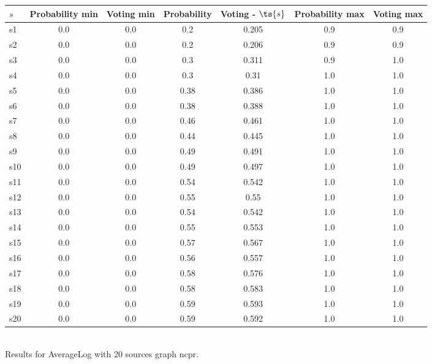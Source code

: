 \documentclass{article}
\begin{document}
\noindent\begin{tabular}{|l|c|c|c|c|c|c|}
\hline
$s$& Probability min & Voting min & Probability & Voting - $\ts{s}$ & Probability max & Voting max\\
\hline
s1 &0.0 & 0.0 & 0.2 & 0.205 & 0.9 & 0.9\\
\hline
s2 &0.0 & 0.0 & 0.2 & 0.206 & 0.9 & 0.9\\
\hline
s3 &0.0 & 0.0 & 0.3 & 0.311 & 0.9 & 1.0\\
\hline
s4 &0.0 & 0.0 & 0.3 & 0.31 & 1.0 & 1.0\\
\hline
s5 &0.0 & 0.0 & 0.38 & 0.386 & 1.0 & 1.0\\
\hline
s6 &0.0 & 0.0 & 0.38 & 0.388 & 1.0 & 1.0\\
\hline
s7 &0.0 & 0.0 & 0.46 & 0.461 & 1.0 & 1.0\\
\hline
s8 &0.0 & 0.0 & 0.44 & 0.445 & 1.0 & 1.0\\
\hline
s9 &0.0 & 0.0 & 0.49 & 0.491 & 1.0 & 1.0\\
\hline
s10 &0.0 & 0.0 & 0.49 & 0.497 & 1.0 & 1.0\\
\hline
s11 &0.0 & 0.0 & 0.54 & 0.542 & 1.0 & 1.0\\
\hline
s12 &0.0 & 0.0 & 0.55 & 0.55 & 1.0 & 1.0\\
\hline
s13 &0.0 & 0.0 & 0.54 & 0.542 & 1.0 & 1.0\\
\hline
s14 &0.0 & 0.0 & 0.55 & 0.553 & 1.0 & 1.0\\
\hline
s15 &0.0 & 0.0 & 0.57 & 0.567 & 1.0 & 1.0\\
\hline
s16 &0.0 & 0.0 & 0.56 & 0.557 & 1.0 & 1.0\\
\hline
s17 &0.0 & 0.0 & 0.58 & 0.576 & 1.0 & 1.0\\
\hline
s18 &0.0 & 0.0 & 0.58 & 0.583 & 1.0 & 1.0\\
\hline
s19 &0.0 & 0.0 & 0.59 & 0.593 & 1.0 & 1.0\\
\hline
s20 &0.0 & 0.0 & 0.59 & 0.592 & 1.0 & 1.0\\
\hline
\end{tabular}\\

\noindent Results for AverageLog with 20 sources graph ncpr.
\end{document}
